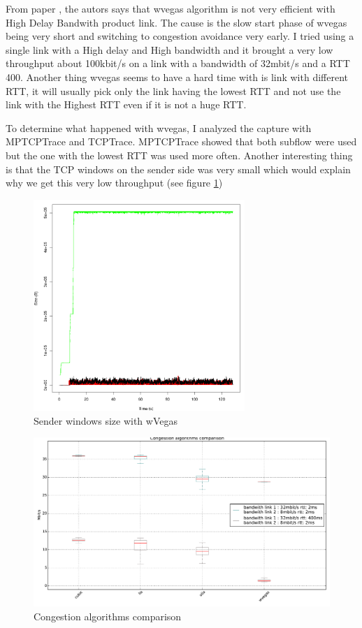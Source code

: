 From paper \cite{cao2012delay}, the autors says that wvegas algorithm is not very efficient with High Delay Bandwith product link.
The cause is the slow start phase of wvegas being very short and switching to congestion avoidance very early.
I tried using a single link with a High delay and High bandwidth and it brought a very low throughput about 100kbit/s on a link with a bandwidth of 32mbit/s and a RTT 400.
Another thing wvegas seems to have a hard time with is link with different RTT, it will usually pick only the link having the lowest RTT and not use the link with the Highest RTT even
if it is not a huge RTT.

To determine what happened with wvegas, I analyzed the capture with MPTCPTrace and TCPTrace. MPTCPTrace showed that both subflow were used but the one with the lowest RTT was used more often.
Another interesting thing is that the TCP windows on the sender side was very small which would explain why we get this very low throughput (see figure \ref{sender_windows_size})

\begin{figure}[h!]
  \centering
  \includegraphics[width=8cm]{../results/window_wvegas_small.pdf}
  \caption{Sender windows size with wVegas}
  \label{sender_windows_size}
\end{figure}

\begin{figure}[h!]
  \centering
  \includegraphics[width=1\textwidth]{../results/all_congestion_algo.pdf}
  \caption{Congestion algorithms comparison}
  \label{all_congestion_algo}
\end{figure}

